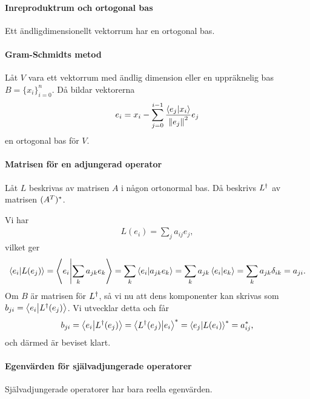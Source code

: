 \proof

\paragraph{Inreproduktrum och ortogonal bas}
Ett ändligdimensionellt vektorrum har en ortogonal bas.

\proof

\paragraph{Gram-Schmidts metod}
Låt $V$ vara ett vektorrum med ändlig dimension eller en uppräknelig bas $B = \{x_{i}\}_{i= 0}^{n}$. Då bildar vektorerna
\begin{align*}
	e_{i} = x_{i} - \sum\limits_{j = 0}^{i - 1}\frac{\bra{e_{j}}\ket{x_{i}}}{\norm{e_{j}}^{2}}e_{j}
\end{align*}
en ortogonal bas för $V$.

\proof

\paragraph{Matrisen för en adjungerad operator}
Låt $L$ beskrivas av matrisen $A$ i någon ortonormal bas. Då beskrivs $L^{\dagger}$ av matrisen $(A^{T})^{*}$.

\proof
Vi har
\begin{align*}
	L(e_{i}) = \sum\limits_{j}a_{ij}e_{j},
\end{align*}
vilket ger
\begin{align*}
	\bra{e_{i}}\ket{L(e_{j})} = \bra{e_{i}}\ket{\sum\limits_{k}a_{jk}e_{k}} = \sum\limits_{k}\bra{e_{i}}\ket{a_{jk}e_{k}} = \sum\limits_{k}a_{jk}\bra{e_{i}}\ket{e_{k}} = \sum\limits_{k}a_{jk}\delta_{ik} = a_{ji}.
\end{align*}
Om $B$ är matrisen för $L^{\dagger}$, så vi nu att dens komponenter kan skrivas som $b_{ji} = \bra{e_{i}}\ket{L^{\dagger}(e_{j})}$. Vi utvecklar detta och får
\begin{align*}
	b_{ji} = \bra{e_{i}}\ket{L^{\dagger}(e_{j})} = \bra{L^{\dagger}(e_{j})}\ket{e_{i}}^{*} = \bra{e_{j}}\ket{L(e_{i})}^{*} = a_{ij}^{*},
\end{align*}
och därmed är beviset klart.

\paragraph{Egenvärden för självadjungerade operatorer}
Självadjungerade operatorer har bara reella egenvärden.

